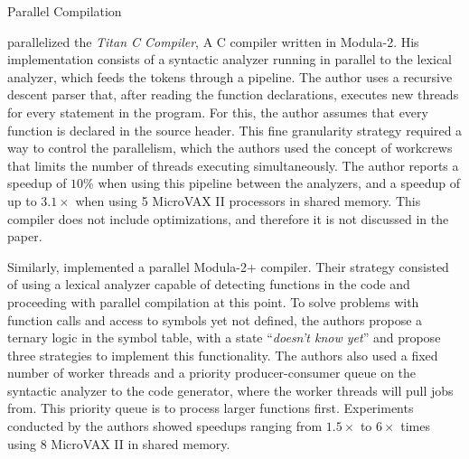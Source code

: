 \begin{section}{Parallel Compilation}

 \cite{vandevoorde1988parallel} parallelized the \textit{Titan C Compiler}, A C
 compiler written in Modula-2. His implementation consists of a syntactic
 analyzer running in parallel to the lexical analyzer, which feeds the tokens
 through a pipeline. The author uses a recursive descent parser that, after
 reading the function declarations, executes new threads for every statement in
 the program. For this, the author assumes that every function is declared in
 the source header. This fine granularity strategy required a way to control
 the parallelism, which the authors used the concept of workcrews that limits
 the number of threads executing simultaneously. The author reports a speedup
 of $10\%$ when using this pipeline between the analyzers, and a speedup of up
 to $3.1\times$ when using 5 MicroVAX II processors in shared memory. This
 compiler does not include optimizations, and therefore it is not discussed in
 the paper.



Similarly, \cite{wortman1992} implemented a parallel Modula-2+ compiler. Their strategy
consisted of using a lexical analyzer capable of detecting functions in the
code and proceeding with parallel compilation at this point. To solve problems
with function calls and access to symbols yet not defined, the authors propose
a ternary logic in the symbol table, with a state ``\textit{doesn't know yet}'' and
propose three strategies to implement this functionality. The authors also used
a fixed number of worker threads and a priority producer-consumer queue on the
syntactic analyzer to the code generator, where the worker threads will pull
jobs from. This priority queue is to process larger functions first.
Experiments conducted by the authors showed speedups ranging from $1.5\times$ to
$6\times$ times using 8 MicroVAX II in shared memory.



\end{section}
